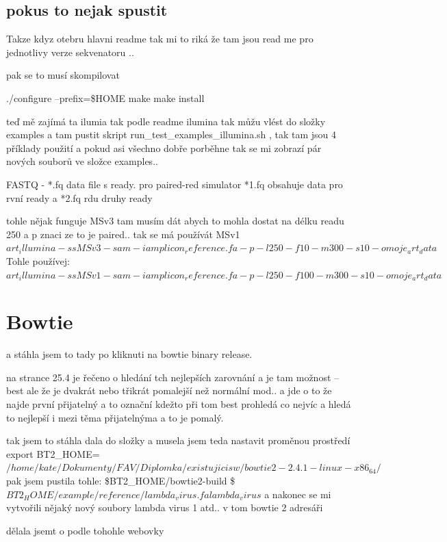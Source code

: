 \documentclass[czech,DP]{thesiskiv}
\numberwithin{equation}{section}
\begin{document}
\subsection{pokus to nejak spustit}
Takze kdyz otebru hlavni readme tak mi to riká že tam jsou read me pro jednotlivy verze sekvenatoru ..

pak se to musí skompilovat 

./configure --prefix=\$HOME
	       	make
	       	make install	 
	 
teď mě zajímá ta ilumia tak podle readme ilumina tak můžu vlést do složky examples a tam pustit skript run\_test\_examples\_illumina.sh , tak tam jsou 4 příklady použití 
a pokud asi všechno dobře porběhne tak se mi zobrazí pár nových souborů ve složce examples.. 

FASTQ - *.fq data file s ready. pro paired-red simulator
*1.fq obsahuje data pro rvní ready a *2.fq rdu druhy ready

tohle nějak funguje
MSv3 tam musím dát abych to mohla dostat na délku readu 250 a p znaci ze to je paired.. 
tak se má používát MSv1
$art_illumina -ss MSv3 -sam -i amplicon_reference.fa -p -l 250 -f 10 -m 300 -s 10 -o moje_art_data$
Tohle používej:
$art_illumina -ss MSv1 -sam -i amplicon_reference.fa -p -l 250 -f 100 -m 300 -s 10 -o moje_art_data$

\section{Bowtie}
 a stáhla jsem to tady %
 po kliknuti na bowtie binary release.

na strance 25.4 je řečeno o hledání tch nejlepších zarovnání a je tam možnost --best ale že je dvakrát nebo třikrát pomalejší než normální mod.. a jde o to že najde první přijatelný a to označní kdežto při tom best prohledá co nejvíc a hledá to nejlepší i mezi těma přijatelnýma a to je pomalý.


tak jsem  to stáhla dala do složky a musela jsem teda nastavit proměnou prostředí 
export BT2\_HOME=$/home/kate/Dokumenty/FAV/Diplomka/existujicisw/bowtie2-2.4.1-linux-x86_64/$
pak jsem pustila tohle: 
\$BT2\_HOME/bowtie2-build \$ $BT2_HOME/example/reference/lambda_virus.fa lambda_virus$
a nakonec se mi vytvořili nějaký nový soubory lambda virus 1 atd.. v tom bowtie 2 adresáři

dělala jsemt o podle tohohle webovky %
\end{document}
